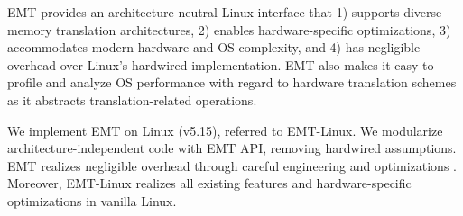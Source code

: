 EMT provides an architecture-neutral Linux interface that 
	1) supports diverse memory translation architectures,
    2) enables hardware-specific optimizations,
	3) accommodates modern hardware and OS complexity,
	and 4) has negligible overhead over Linux's hardwired implementation.
EMT also makes it easy to profile and analyze OS performance with regard to 
	hardware translation schemes as it abstracts translation-related
	operations. %


We implement EMT on Linux (v5.15), referred to EMT-Linux. 
We modularize
	architecture-independent code with EMT API, removing 
	hardwired assumptions.
EMT realizes negligible overhead %
	through careful engineering and optimizations
	.
Moreover, EMT-Linux realizes all existing features and 
	hardware-specific optimizations
	in vanilla Linux.
	
